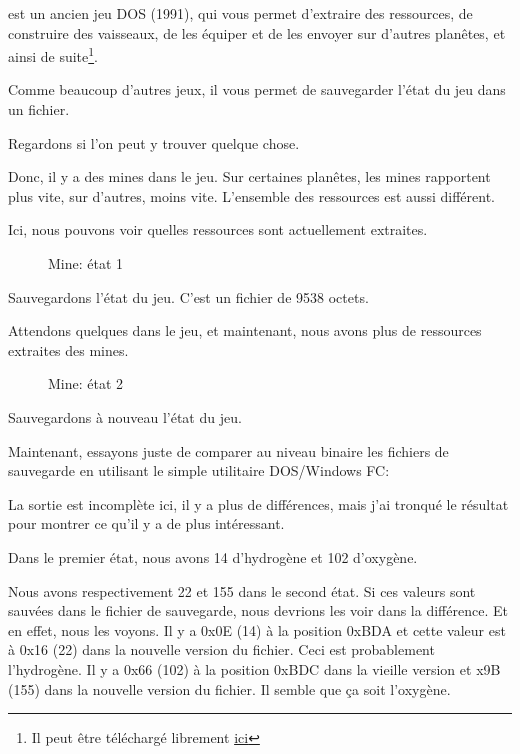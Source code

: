 ﻿
\label{Millenium_DOS_game}

 est un ancien jeu DOS (1991), qui vous permet d'extraire
des ressources, de construire des vaisseaux, de les équiper et de les envoyer sur d'autres
planêtes, et ainsi de suite\footnote{Il peut être téléchargé librement \href{http://go.yurichev.com/17316}{ici}}.

Comme beaucoup d'autres jeux, il vous permet de sauvegarder l'état du jeu dans un fichier.

Regardons si l'on peut y trouver quelque chose.

\clearpage
Donc, il y a des mines dans le jeu.
Sur certaines planêtes, les mines rapportent plus vite, sur d'autres, moins vite. 
L'ensemble des ressources est aussi différent.

Ici, nous pouvons voir quelles ressources sont actuellement extraites.

\begin{figure}[H]
\centering
{}
\caption{Mine: état 1}
\label{fig:mill_1}
\end{figure}

Sauvegardons l'état du jeu.
C'est un fichier de 9538 octets.

Attendons quelques  dans le jeu, et maintenant, nous avons plus de ressources
extraites des mines.

\begin{figure}[H]
\centering
{}
\caption{Mine: état 2}
\label{fig:mill_2}
\end{figure}

Sauvegardons à nouveau l'état du jeu.

Maintenant, essayons juste de comparer au niveau binaire les fichiers de sauvegarde
en utilisant le simple utilitaire DOS/Windows FC:



La sortie est incomplète ici, il y a plus de différences, mais j'ai tronqué le résultat
pour montrer ce qu'il y a de plus intéressant.

Dans le premier état, nous avons 14  d'hydrogène et 102  d'oxygène.

Nous avons respectivement 22 et 155  dans le second état.
Si ces valeurs sont sauvées dans le fichier de sauvegarde, nous devrions les voir
dans la différence.
Et en effet, nous les voyons.
Il y a 0x0E (14) à la position 0xBDA et cette valeur est à 0x16 (22) dans la nouvelle
version du fichier.
Ceci est probablement l'hydrogène.
Il y a 0x66 (102) à la position 0xBDC dans la vieille version et x9B (155) dans la
nouvelle version du fichier.
Il semble que ça soit l'oxygène.

